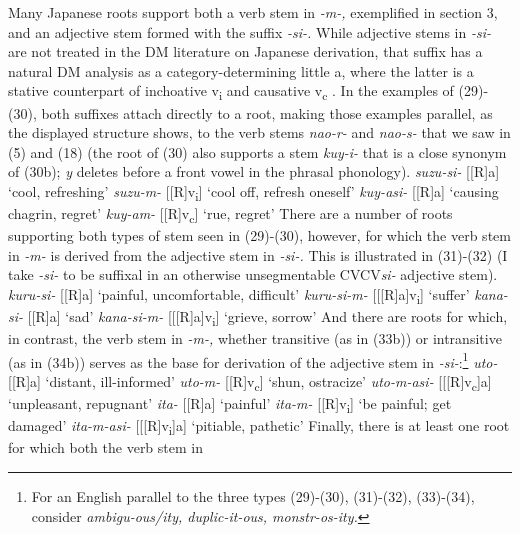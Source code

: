 \documentclass[output=paper,
modfonts
]{LSP/langsci}
\begin{document}
Many Japanese roots support both a verb stem in \textit{-m-,} exemplified
in section 3, and an adjective stem formed with the suffix \textit{-si-.}
While adjective stems in \textit{-si-} are not treated in the DM
literature on Japanese derivation, that suffix has a natural DM analysis
as a category-determining little a, where the latter is a stative
counterpart of inchoative v\textsubscript{i} and causative
v\textsubscript{c} \citep[103]{marantz2013a}. In the examples of (29)-(30),
both suffixes attach directly to a root, making those examples parallel,
as the displayed structure shows, to the verb stems \textit{nao-r-} and
\textit{nao-s-} that we saw in (5) and (18) (the root of (30) also
supports a stem \textit{kuy-i-} that is a close synonym of (30b); \textit{y}
deletes before a front vowel in the phrasal phonology).
\ea
	\ea \textit{suzu-si-} {[}{[}R{]}a{]} `cool, refreshing'
	\ex \textit{suzu-m-} {[}{[}R{]}v\textsubscript{i}{]} `cool off, refresh oneself'
	\z
\ex 
	\ea \textit{kuy-asi-} {[}{[}R{]}a{]} `causing chagrin, regret'
	\ex \textit{kuy-am-} {[}{[}R{]}v\textsubscript{c}{]} `rue, regret'
	\z
\z
There are a number of roots supporting both types of stem seen in
(29)-(30), however, for which the verb stem in \textit{-m-} is derived
from the adjective stem in \textit{-si-.} This is illustrated in (31)-(32)
(I take \textit{-si-} to be suffixal in an otherwise unsegmentable
CVCV\textit{si-} adjective stem).
\ea
	\ea \textit{kuru-si-} {[}{[}R{]}a{]} `painful, uncomfortable, difficult'
	\ex \textit{kuru-si-m-} {[}{[}{[}R{]}a{]}v\textsubscript{i}{]} `suffer'
	\z
\ex 
	\ea \textit{kana-si-} {[}{[}R{]}a{]} `sad'
	\ex \textit{kana-si-m-} {[}{[}{[}R{]}a{]}v\textsubscript{i}{]} `grieve, sorrow'
	\z
\z
And there are roots for which, in contrast, the verb stem in \textit{-m-,}
whether transitive (as in (33b)) or intransitive (as in (34b)) serves as
the base for derivation of the adjective stem in \textit{-si-}:\footnote{For
  an English parallel to the three types (29)-(30), (31)-(32), (33)-(34),
  consider \textit{ambigu-ous/ity, duplic-it-ous, monstr-os-ity.}}
\ea
	\ea \textit{uto-} {[}{[}R{]}a{]} `distant, ill-informed'
	\ex \textit{uto-m-} {[}{[}R{]}v\textsubscript{c}{]} `shun, ostracize'
	\ex \textit{uto-m-asi-} {[}{[}{[}R{]}v\textsubscript{c}{]}a{]} `unpleasant, repugnant'
	\z
\ex 
	\ea \textit{ita-} {[}{[}R{]}a{]} `painful'
	\ex \textit{ita-m-} {[}{[}R{]}v\textsubscript{i}{]} `be painful; get damaged'
	\ex \textit{ita-m-asi-} {[}{[}{[}R{]}v\textsubscript{i}{]}a{]} `pitiable, pathetic'
	\z
\z
Finally, there is at least one root for which both the verb stem in
\end{document}
